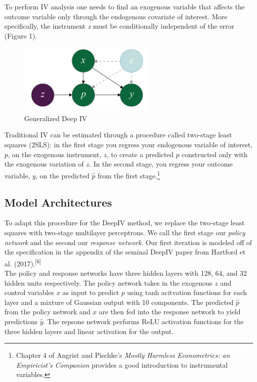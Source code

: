 \documentclass[11pt, oneside, twocolumn]{article}   	%
\begin{document}
To perform IV analysis one needs to find an exogenous variable that affects the outcome variable only through the endogenous covariate of interest. More specifically, the instrument \emph{z} must be conditionally independent of the error (Figure 1).\\

\begin{figure}[h]
	\caption{Generalized Deep IV}
	\centering
	\includegraphics[width=0.6\textwidth]{Figure_1.png}
\end{figure}

Traditional IV can be estimated through a procedure called two-stage least squares (2SLS): in the first stage you regress your endogenous variable of interest, $p$,  on the exogenous instrument, $z$, to create a predicted $\hat{p}$ constructed only with the exogenous variation of $z$. In the second stage, you regress your outcome variable, $y$, on the predicted $\hat{p}$ from the first stage.\footnote{Chapter 4 of Angrist and Pischke's \emph{Mostly Harmless Econometrics: an Empiricist's Companion} provides a good introduction to instrumental variables.}\\

\subsection{Model Architectures}

To adapt this procedure for the DeepIV method, we replace the two-stage least squares with two-stage multilayer perceptrons. We call the first stage our \emph{policy network} and the second our \emph{response network}. Our first iteration is modeled off of the specification in the appendix of the seminal DeepIV paper from Hartford et al. (2017).\textsuperscript{[6]}\\

The policy and response networks have three hidden layers with 128, 64, and 32 hidden units respectively. The policy network takes in the exogenous $z$ and control variables $x$ as input to predict $p$ using tanh acitvation functions for each layer and a mixture of Gaussian output with 10 components. The predicted $\hat{p}$ from the policy network and $x$ are then fed into the response network to yield predictions $\hat{y}$. The repsone network performs ReLU activation functions for the three hidden layers and linear activation for the output. \\
\end{document}
